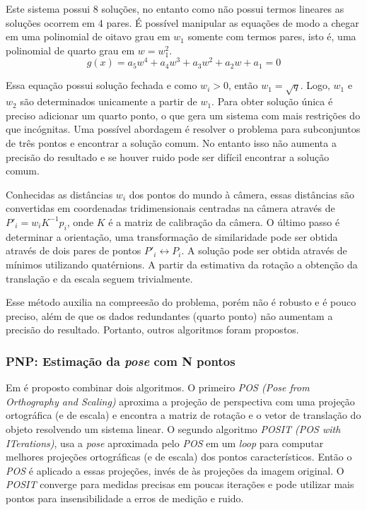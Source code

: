 Este sistema possui 8 soluções, no entanto como não possui termos lineares as soluções ocorrem em 4 pares. É possível manipular as equações de modo a chegar em uma polinomial de oitavo grau em $w_1$ somente com termos pares, isto é, uma polinomial de quarto grau em $w = w_1^2$.
\begin{equation}
g(x) = a_5 w^4 + a_4 w^3 + a_3 w^2 + a_2 w + a_1 = 0
\end{equation}

Essa equação possui solução fechada e como $w_i > 0$, então $w_1 = \sqrt{q}$. Logo, $w_1$ e $w_2$ são determinados unicamente a partir de $w_1$. Para obter solução única é preciso adicionar um quarto ponto, o que gera um sistema com mais restrições do que incógnitas. Uma possível abordagem é resolver o problema para subconjuntos de três pontos e encontrar a solução comum. No entanto isso não aumenta a precisão do resultado e se houver ruido pode ser difícil encontrar a solução comum. 

Conhecidas as distâncias $w_i$ dos pontos do mundo à câmera, essas distâncias são convertidas em coordenadas tridimensionais centradas na câmera através de ${P'}_i = w_i {K}^{-1} {p}_i$, onde ${K}$ é a matriz de calibração da câmera. O último passo é determinar a orientação, uma transformação de similaridade pode ser obtida através de dois pares de pontos ${P'}_i \leftrightarrow {P}_i$. A solução pode ser obtida através de mínimos utilizando quatérnions. A partir da estimativa da rotação a obtenção da translação e da escala seguem trivialmente. 

Esse método auxilia na compreesão do problema, porém não é robusto e é pouco preciso, além de que os dados redundantes (quarto ponto) não aumentam a precisão do resultado. Portanto, outros algoritmos foram propostos.

\subsubsection{PNP: Estimação da \textit{pose} com N pontos}
Em \citep{dementhon1995model} é proposto combinar dois algoritmos. O primeiro \textit{POS (Pose from Orthography and Scaling)} aproxima a projeção de perspectiva com uma projeção ortográfica (e de escala) e encontra a matriz de rotação e o vetor de translação do objeto resolvendo um sistema linear. O segundo algoritmo \textit{POSIT (POS with ITerations)}, usa a \textit{pose} aproximada pelo \textit{POS} em um \textit{loop} para computar melhores projeções ortográficas (e de escala) dos pontos característicos. Então o \textit{POS} é aplicado a essas projeções, invés de às projeções da imagem original. O \textit{POSIT} converge para medidas precisas em poucas iterações e pode utilizar mais pontos para insensibilidade a erros de medição e ruido. 

